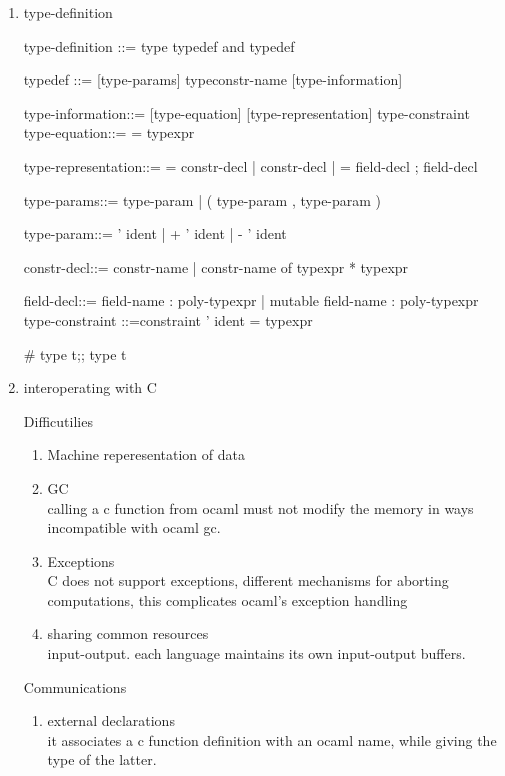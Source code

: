 \begin{enumerate}
  \item type-definition

\begin{ocamlcode}

type-definition	::= type typedef  { and typedef }  
 
typedef	::= [type-params]  typeconstr-name  [type-information]  
 
type-information::=
  [type-equation] [type-representation]{ type-constraint }  
type-equation::= = typexpr  
 
type-representation::=
          = constr-decl  { | constr-decl }  
 	| = { field-decl  { ; field-decl } }  

type-params::=	type-param  
 	| ( type-param  { , type-param } )  
 
type-param::=	' ident  
 	| + ' ident  
 	| - ' ident  
 
constr-decl::=	constr-name  
 	| constr-name of  typexpr  { * typexpr }  
 
field-decl::=	field-name :  poly-typexpr  
 	| mutable field-name :  poly-typexpr  
type-constraint	::=constraint ' ident =  typexpr
\end{ocamlcode}

\begin{alternate}
# type t;;
type t
\end{alternate}

\item  interoperating with C

  Difficutilies 
  \begin{enumerate}
  \item Machine reperesentation of data
  \item GC \\
    calling a c function from ocaml must not modify the memory in ways incompatible
    with ocaml gc.
  \item Exceptions \\
    C does not support exceptions, different mechanisms for aborting computations,
    this complicates ocaml's exception handling
  \item sharing common resources \\
    input-output. each language maintains its own input-output buffers.
  \end{enumerate}

  Communications
  \begin{enumerate}
  \item external declarations \\
    it associates a c function definition with an ocaml name, while giving the
    type of the latter.


\end{enumerate}
\end{enumerate}
